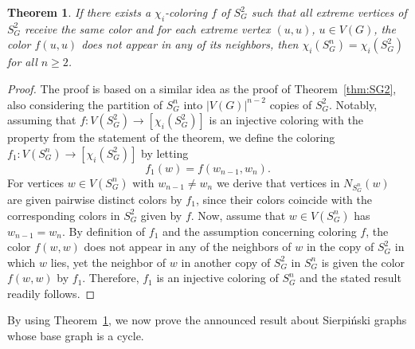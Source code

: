 \documentclass{article}
\newtheorem{theorem}{Theorem}[section]
\begin{document}
\begin{theorem}
\label{thm:SG2suff}
If there exists a $\chi_i$-coloring $f$ of $S_G^2$ such that all extreme vertices of $S_G^2$ receive the same color and for each extreme vertex $(u,u)$, $u\in V(G)$, the color $f(u,u)$ does not appear in any of its neighbors,  then $\chi_i(S_G^n)= \chi_i(S_G^2)$ for all $n\geq 2$.
\end{theorem}
\begin{proof}
The proof is based on a similar idea as the proof of Theorem~\ref{thm:SG2}, also considering the partition of $S_G^n$ into $|V(G)|^{n-2}$ copies of $S_G^2$. Notably, assuming that $f:V(S_G^2)\rightarrow [\chi_i(S_G^2)]$ is an injective coloring with the property from the statement of the theorem, we define the coloring $f_1:V(S_G^n)\rightarrow [\chi_i(S_G^2)]$ by letting $$f_1(w)=f(w_{n-1},w_n).$$ 
For vertices $w\in V(S_G^n)$ with $w_{n-1}\ne w_{n}$ we derive that vertices in $N_{S_G^n}(w)$ are given pairwise distinct colors by $f_1$, since their colors coincide with the corresponding colors in $S_G^2$ given by $f$. Now, assume that $w\in V(S_G^n)$ has $w_{n-1}=w_{n}$. By definition of $f_1$ and the assumption concerning coloring $f$, the color $f(w,w)$ does not appear in any of the neighbors of $w$ in the copy of $S_G^2$ in which $w$ lies, yet the neighbor of $w$ in another copy of $S_G^2$ in $S_G^n$ is given the color $f(w,w)$ by $f_1$. Therefore, $f_1$ is an injective coloring of $S_G^n$ and the stated result readily follows. 
\end{proof}	

By using Theorem~\ref{thm:SG2suff}, we now prove the announced result about Sierpi\'nski graphs whose base graph is a cycle. 
\end{document}
